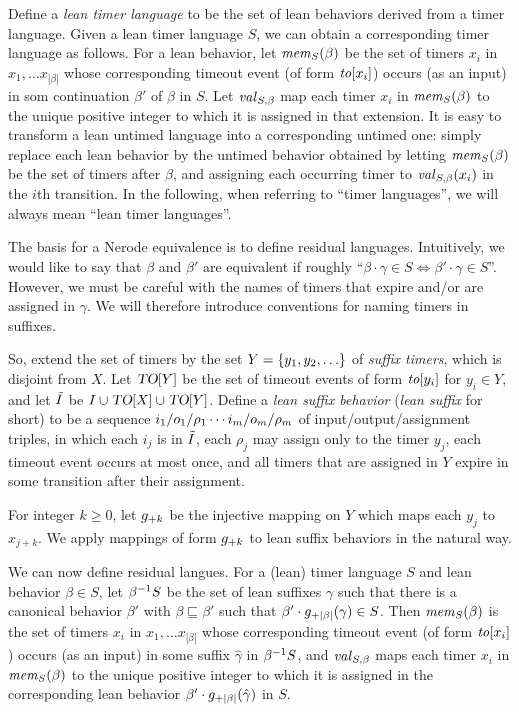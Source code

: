 Define a {\em lean timer language} to be the set of lean behaviors derived from
a timer language. Given a lean timer language $S$, we can obtain a corresponding
timer language as follows. For a lean behavior, 
let $\mathit{mem}_{S}(\beta)$ be the set of timers $x_i$ in
$x_1 , \ldots x_{|\beta|}$ whose corresponding timeout event
(of form $\mathit{to}[x_i]$) occurs (as an input) in som continuation $\beta'$
of $\beta$ in $S$.
Let $\mathit{val}_{S,\beta}$ map each timer $x_i$ in
$\mathit{mem}_{S}(\beta)$ to the unique positive integer to which it
is assigned in that extension.
It is easy to transform a lean untimed language into a corresponding untimed one:
simply replace each lean behavior by the untimed behavior obtained by
letting $\mathit{mem}_{S}(\beta)$ be the set of timers after $\beta$,
and assigning each occurring timer to 
$\mathit{val}_{S,\beta}(x_i)$ in the $i$th transition.
In the following, when referring to ``timer languages'', we will always
mean ``lean timer languages''.

The basis for a Nerode equivalence is to define residual languages.
Intuitively, we would like to say that $\beta$ and $\beta'$ are equivalent if
roughly
``$\beta \cdot \gamma \in S \iff \beta' \cdot \gamma \in S$''. However, we must
be careful with the names of timers that expire and/or are assigned in $\gamma$.
We will therefore introduce conventions for naming timers in suffixes.

So, extend the set of timers by the set $Y = \lbrace y_1,y_2,\ldots\rbrace$ of
{\em suffix timers}, which is disjoint from $X$.
Let $\mbox{\sl TO}[Y]$ be the set of timeout events of form
$\mathit{to}[y_i]$ for $y_i \in Y$, and let
$\tilde{I}$ be $I \cup \mbox{\sl TO}[X] \cup \mbox{\sl TO}[Y]$.
Define a {\em lean suffix behavior} ({\em lean suffix} for short)
to be a sequence
$i_1/o_1/\rho_1 \cdots i_m/o_m/\rho_m$ of input/output/assignment triples,
in which each $i_j$ is in $\tilde{I}$, 
each $\rho_j$ may assign only to the timer $y_j$,
each timeout event occurs at most once,
and all timers that are assigned in $Y$ expire in some transition
after their assignment.

For integer $k \geq 0$, let $g_{+{k}}$ be the injective mapping on
$Y$ which maps each $y_j$ to $x_{j+k}$.  We apply mappings of form
$g_{+{k}}$ to lean suffix behaviors in the natural way.

We can now define residual langues. For a (lean) timer language $S$ and lean
behavior $\beta \in S$, let
${\beta}^{-1}{S}$ be the set of lean suffixes $\gamma$ such that
there is a canonical behavior $\beta'$ with $\beta \sqsubseteq \beta'$ such that
$\beta'\cdot g_{+{|\beta|}}(\gamma) \in S$.
Then $\mathit{mem}_{S}(\beta)$ is the set of timers $x_i$ in
$x_1 , \ldots x_{|\beta|}$ whose corresponding timeout event
(of form $\mathit{to}[x_i]$) occurs (as an input) in some suffix $\hat{\gamma}$ in
${\beta}^{-1}{S}$, and
$\mathit{val}_{S,\beta}$ maps each timer $x_i$ in
$\mathit{mem}_{S}(\beta)$ to the unique positive integer to which it
is assigned in the corresponding
lean behavior $\beta'\cdot g_{+{|\beta|}}(\hat{\gamma})$
in $S$.

